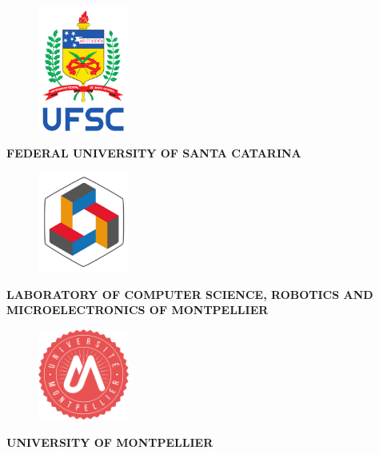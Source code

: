 %
%
%
%
%

%
%
%
%
%

 
\thispagestyle{empty}

\begin{center}
    \begin{figure}[!ht]
        \begin{center}
            \includegraphics[width=3cm]{figures/ufsc.pdf}
        \end{center}
    \end{figure}
    \small{\textbf{FEDERAL UNIVERSITY OF SANTA CATARINA}}
\end{center}

\begin{center}
    \begin{figure}[!ht]
        \begin{center}
            \includegraphics[width=3cm]{figures/lirmm.png}
        \end{center}
    \end{figure}
    \small{\textbf{LABORATORY OF COMPUTER SCIENCE, ROBOTICS AND MICROELECTRONICS OF MONTPELLIER}}
\end{center}

\begin{center}
    \begin{figure}[!ht]
        \begin{center}
            \includegraphics[width=3cm]{figures/um.png}
        \end{center}
    \end{figure}
    \small{\textbf{UNIVERSITY OF MONTPELLIER}}
\end{center}


